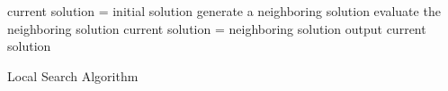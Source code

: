 \setlength{\textfloatsep}{0.2cm}
\begin{algorithm2e}[htb]
	current solution = initial solution\;
	{
		generate a neighboring solution\;
		evaluate the neighboring solution\;
		{
			current solution = neighboring solution\;
		}
	}
	output current solution\;
	\caption{Local Search Algorithm}
	\label{algo:local_search}
\end{algorithm2e}
\setlength{\textfloatsep}{0.2cm}